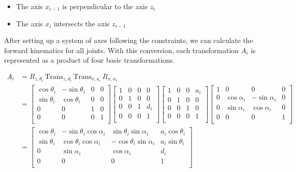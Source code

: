 \begin{itemize}
  \item The axis $x_{i-1}$ is perpendicular to the axis $z_i$
  \item The axis $x_i$ intersects the axis $z_{i-1}$
\end{itemize}

After setting up a system of axes following the constraints, we can calculate the forward kinematics for all joints. With this conversion, each transformation $A_i$ is represented as a product of four basic transformations.

\begin{equation}
\begin{aligned}
    A_i &= R_{z,\theta_i} \, \text{Trans}_{z,d_i} \, \text{Trans}_{x,a_i} \, R_{x,\alpha_i} \\
    &= \begin{bmatrix}
        \cos \theta_i & -\sin \theta_i & 0 & 0 \\
        \sin \theta_i & \cos \theta_i & 0 & 0 \\
        0 & 0 & 1 & 0 \\
        0 & 0 & 0 & 1 \\
    \end{bmatrix}
    \begin{bmatrix}
        1 & 0 & 0 & 0 \\
        0 & 1 & 0 & 0 \\
        0 & 0 & 1 & d_i \\
        0 & 0 & 0 & 1 \\
    \end{bmatrix}
    \begin{bmatrix}
        1 & 0 & 0 & a_i \\
        0 & 1 & 0 & 0 \\
        0 & 0 & 1 & 0 \\
        0 & 0 & 0 & 1 \\
    \end{bmatrix}
    \begin{bmatrix}
        1 & 0 & 0 & 0 \\
        0 & \cos \alpha_i & -\sin \alpha_i & 0 \\
        0 & \sin \alpha_i & \cos \alpha_i & 0 \\
        0 & 0 & 0 & 1 \\
    \end{bmatrix}
    \\
    &= \begin{bmatrix}
        \cos \theta_i & -\sin \theta_i\cos \alpha_i & \sin \theta_i\sin \alpha_i & a_i\cos \theta_i \\
        \sin \theta_i & \cos \theta_i\cos \alpha_i & -\cos \theta_i\sin \alpha_i & a_i\sin \theta_i \\
        0 & \sin \alpha_i & \cos \alpha_i & d_i \\
        0 & 0 & 0 & 1 \\
    \end{bmatrix}
\end{aligned}
\end{equation}
